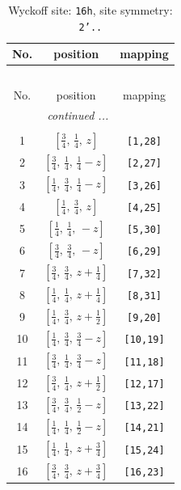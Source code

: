 \documentclass[fleqn,8pt]{jsarticle}
\begin{document}
\renewcommand{\arraystretch}{1.2}
\begin{longtable}{ccc}
\caption{Wyckoff site: {\tt 16h}, site symmetry: {\tt 2'..}}
 \\
 \hline \hline
No. & position & mapping \\ \hline \endfirsthead

\multicolumn{2}{l}{\tablename\ \thetable{}} \\
 \hline \hline
No. & position & mapping \\ \hline \endhead

 \hline \hline
\multicolumn{2}{r}{\footnotesize\it continued ...} \\ \endfoot

 \hline \hline
\multicolumn{2}{r}{} \\ \endlastfoot

1 & $\left[ \frac{3}{4},\, \frac{1}{4},\, z \right]$ & {\tt [1,28]} \\ \hline
2 & $\left[ \frac{3}{4},\, \frac{1}{4},\, \frac{1}{4} - z \right]$ & {\tt [2,27]} \\ \hline
3 & $\left[ \frac{1}{4},\, \frac{3}{4},\, \frac{1}{4} - z \right]$ & {\tt [3,26]} \\ \hline
4 & $\left[ \frac{1}{4},\, \frac{3}{4},\, z \right]$ & {\tt [4,25]} \\ \hline
5 & $\left[ \frac{1}{4},\, \frac{1}{4},\, - z \right]$ & {\tt [5,30]} \\ \hline
6 & $\left[ \frac{3}{4},\, \frac{3}{4},\, - z \right]$ & {\tt [6,29]} \\ \hline
7 & $\left[ \frac{3}{4},\, \frac{3}{4},\, z + \frac{1}{4} \right]$ & {\tt [7,32]} \\ \hline
8 & $\left[ \frac{1}{4},\, \frac{1}{4},\, z + \frac{1}{4} \right]$ & {\tt [8,31]} \\ \hline
9 & $\left[ \frac{1}{4},\, \frac{3}{4},\, z + \frac{1}{2} \right]$ & {\tt [9,20]} \\ \hline
10 & $\left[ \frac{1}{4},\, \frac{3}{4},\, \frac{3}{4} - z \right]$ & {\tt [10,19]} \\ \hline
11 & $\left[ \frac{3}{4},\, \frac{1}{4},\, \frac{3}{4} - z \right]$ & {\tt [11,18]} \\ \hline
12 & $\left[ \frac{3}{4},\, \frac{1}{4},\, z + \frac{1}{2} \right]$ & {\tt [12,17]} \\ \hline
13 & $\left[ \frac{3}{4},\, \frac{3}{4},\, \frac{1}{2} - z \right]$ & {\tt [13,22]} \\ \hline
14 & $\left[ \frac{1}{4},\, \frac{1}{4},\, \frac{1}{2} - z \right]$ & {\tt [14,21]} \\ \hline
15 & $\left[ \frac{1}{4},\, \frac{1}{4},\, z + \frac{3}{4} \right]$ & {\tt [15,24]} \\ \hline
16 & $\left[ \frac{3}{4},\, \frac{3}{4},\, z + \frac{3}{4} \right]$ & {\tt [16,23]} \\
\end{longtable}
\end{document}
